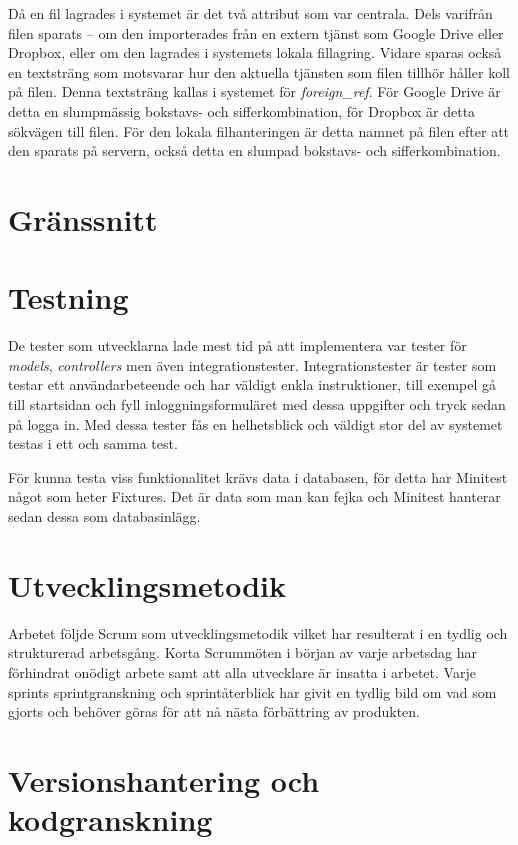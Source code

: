 Då en fil lagrades i systemet är det två attribut som var centrala. Dels
varifrån filen sparats – om den importerades från en extern tjänst som Google
Drive eller Dropbox, eller om den lagrades i systemets lokala fillagring. Vidare
sparas också en textsträng som motsvarar hur den aktuella tjänsten som filen
tillhör håller koll på filen. Denna textsträng kallas i systemet för
\emph{foreign\_ref}. För Google Drive är detta en slumpmässig bokstavs- och
sifferkombination, för Dropbox är detta sökvägen till filen. För den lokala
filhanteringen är detta namnet på filen efter att den sparats på servern, också
detta en slumpad bokstavs- och sifferkombination.

\section{Gränssnitt}

\section{Testning}

De tester som utvecklarna lade mest tid på att implementera var tester för
\emph{models}, \emph{controllers} men även integrationstester.
Integrationstester är tester som testar ett användarbeteende och har väldigt
enkla instruktioner, till exempel gå till startsidan och fyll
inloggningsformuläret med dessa uppgifter och tryck sedan på logga in. Med dessa
tester fås en helhetsblick och väldigt stor del av systemet testas i ett och
samma test.

För kunna testa viss funktionalitet krävs data i databasen, för detta har
Minitest något som heter Fixtures. Det är data som man kan fejka och Minitest
hanterar sedan dessa som databasinlägg.

\section{Utvecklingsmetodik}

Arbetet följde Scrum som utvecklingsmetodik vilket har resulterat i en tydlig
och strukturerad arbetsgång. Korta Scrummöten i början av varje arbetsdag har
förhindrat onödigt arbete samt att alla utvecklare är insatta i arbetet. Varje
sprints sprintgranskning och sprintåterblick har givit en tydlig bild om vad som
gjorts och behöver göras för att nå nästa förbättring av produkten.

\section{Versionshantering och kodgranskning}

